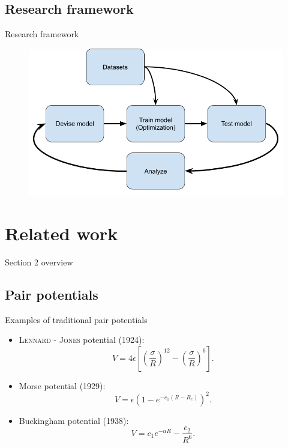 \documentclass{beamer}
\begin{document}
\subsection{Research framework}
\begin{frame}{Research framework}
    \begin{figure}
        \centering
        \includegraphics[scale=0.4]{img/slide/research_framework.png}
        \label{fig:framework_diagram}
    \end{figure}
\end{frame}


\section{Related work}
\begin{frame}{Section 2 overview}
    \tableofcontents[sections={2}]
\end{frame}
\subsection{Pair potentials}
\begin{frame}{Examples of traditional pair potentials}
    \begin{itemize}
        \item \textsc{Lennard - Jones} potential (1924):
            \begin{equation}
                V = 4\epsilon\left[\left(\frac{\sigma}{R}\right)^{12} - \left(\frac{\sigma}{R}\right)^{6} \right].
                \label{eq:lj}
            \end{equation}
        \item Morse potential (1929): 
            \begin{equation}
                V = \epsilon(1-e^{-c_1(R-R_e)})^2.
            \end{equation}
        \item Buckingham potential (1938):
        \begin{equation}
            V = c_1e^{-\alpha R} - \frac{c_2}{R^6}.
            \label{eq:buckingham}
        \end{equation}
    \end{itemize}
\end{frame}
\end{document}
